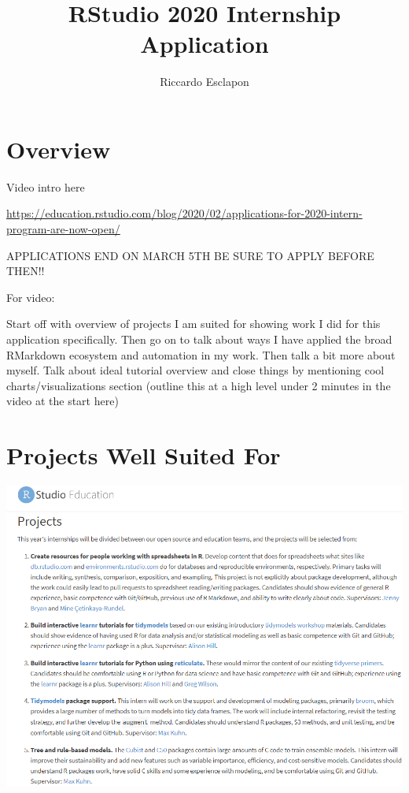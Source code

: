 \documentclass[
]{book}
\title{RStudio 2020 Internship Application}
\author{Riccardo Esclapon}
\date{}
\begin{document}
\maketitle

{
\setcounter{tocdepth}{1}
\tableofcontents
}
\hypertarget{overview}{%
\chapter{Overview}\label{overview}}

Video intro here

\url{https://education.rstudio.com/blog/2020/02/applications-for-2020-intern-program-are-now-open/}

APPLICATIONS END ON MARCH 5TH BE SURE TO APPLY BEFORE THEN!!

For video:

Start off with overview of projects I am suited for showing work I did for this application specifically. Then go on to talk about ways I have applied the broad RMarkdown ecosystem and automation in my work. Then talk a bit more about myself. Talk about ideal tutorial overview and close things by mentioning cool charts/visualizations section (outline this at a high level under 2 minutes in the video at the start here)

\hypertarget{projects-well-suited-for}{%
\chapter{Projects Well Suited For}\label{projects-well-suited-for}}

\includegraphics{images/projects_list.png}
\end{document}
